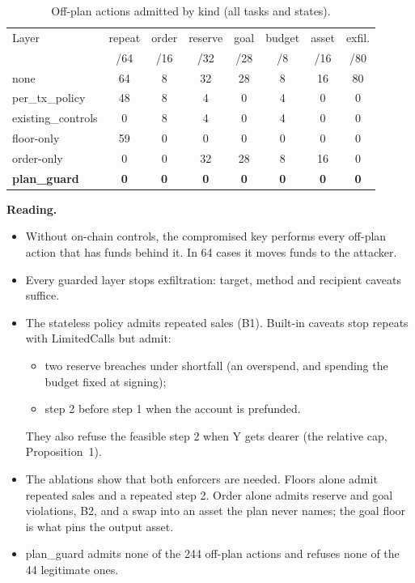 \documentclass[conference]{IEEEtran}
\begin{document}
\begin{table}[t]
\centering
\caption{Off-plan actions admitted by kind (all tasks and states).}
\label{tab:kinds}
\setlength{\tabcolsep}{2.5pt}
\begin{tabular}{lccccccc}
\toprule
Layer & repeat & order & reserve & goal & budget & asset & exfil. \\
 & /64 & /16 & /32 & /28 & /8 & /16 & /80 \\
\midrule
none & 64 & 8 & 32 & 28 & 8 & 16 & 80 \\
per\_tx\_policy & 48 & 8 & 4 & 0 & 4 & 0 & 0 \\
existing\_controls & 0 & 8 & 4 & 0 & 4 & 0 & 0 \\
floor-only & 59 & 0 & 0 & 0 & 0 & 0 & 0 \\
order-only & 0 & 0 & 32 & 28 & 8 & 16 & 0 \\
\textbf{plan\_guard} & \textbf{0} & \textbf{0} & \textbf{0} & \textbf{0} & \textbf{0} & \textbf{0} & \textbf{0} \\
\bottomrule
\end{tabular}
\end{table}

\textbf{Reading.}
\begin{itemize}
\item Without on-chain controls, the compromised key performs every off-plan action that has funds behind it. In
64 cases it moves funds to the attacker.
\item Every guarded layer stops exfiltration: target, method and recipient caveats suffice.
\item The stateless policy admits repeated sales (B1). Built-in caveats stop repeats with LimitedCalls but admit:
\begin{itemize}
\item two reserve breaches under shortfall (an overspend, and spending the budget fixed at signing);
\item step 2 before step 1 when the account is prefunded.
\end{itemize}
They also refuse the feasible step 2 when Y gets dearer (the relative cap, Proposition~1).
\item The ablations show that both enforcers are needed. Floors alone admit repeated sales and a repeated step 2.
Order alone admits reserve and goal violations, B2, and a swap into an asset the plan never names; the goal floor is
what pins the output asset.
\item plan\_guard admits none of the 244 off-plan actions and refuses none of the 44 legitimate ones.
\end{itemize}
\end{document}
